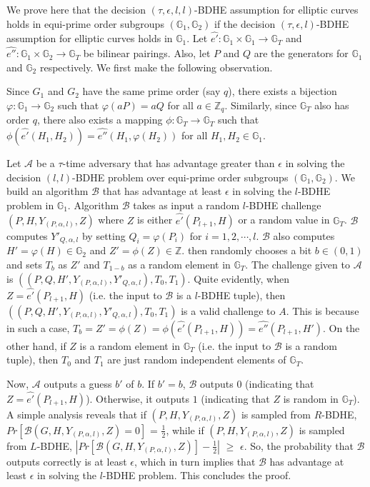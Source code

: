 We prove here that the decision $(\tau,\epsilon,l,l)$-BDHE assumption for elliptic curves holds in equi-prime order subgroups $(\mathbb{G}_1,\mathbb{G}_2)$ if the decision $(\tau,\epsilon,l)$-BDHE assumption for elliptic curves holds in $\mathbb{G}_1$. Let $\hat{e'}:\mathbb{G}_1\times \mathbb{G}_1\longrightarrow\mathbb{G}_T$ and $\hat{e''}:\mathbb{G}_1\times \mathbb{G}_2\longrightarrow\mathbb{G}_T$ be bilinear pairings. Also, let $P$ and $Q$ are the generators for $\mathbb{G}_1$ and $\mathbb{G}_2$ respectively. We first make the following observation. 

 Since $G_1$ and $G_2$ have the same prime order (say $q$), there exists a bijection $\varphi:\mathbb{G}_1\longrightarrow\mathbb{G}_2$ such that $\varphi(aP)=aQ$ for all $a\in\mathbb{Z}_q$. Similarly, since $\mathbb{G}_T$ also has order $q$, there also exists a mapping $\phi:\mathbb{G}_T\longrightarrow\mathbb{G}_T$ such that $\phi(\hat{e'}(H_1,H_2))=\hat{e''}(H_1,\varphi(H_2))$ for all $H_1,H_2 \in \mathbb{G}_1$.

Let $\mathcal{A}$ be a $\tau$-time adversary that has advantage greater than $\epsilon$ in solving the decision $(l,l)$-BDHE problem over equi-prime order subgroups $(\mathbb{G}_1,\mathbb{G}_2)$. We build an algorithm $\mathcal{B}$ that has advantage at least $\epsilon$ in solving the $l$-BDHE problem in $\mathbb{G}_1$. Algorithm $\mathcal{B}$ takes as input a random $l$-BDHE challenge $(P,H,Y_{(P,\alpha,l)},Z)$ where $Z$ is either $\hat{e'}(P_{l+1},H)$ or a random value in $\mathbb{G}_T$. $\mathcal{B}$ computes $Y'_{Q,\alpha,l}$ by setting $Q_i=\varphi(P_i)$ for $i=1,2,\cdots,l$. $\mathcal{B}$ also computes $H'=\varphi(H)\in\mathbb{G}_2$ and $Z'=\phi(Z)\in\mathbb{Z}$. then randomly chooses a bit $b\in{(0,1)}$ and sets $T_b$ as $Z'$ and $T_{1-b}$ as a random element in $\mathbb{G}_T$. The challenge given to $\mathcal{A}$ is 
$((P,Q,H',Y_{(P,\alpha,l)},Y'_{Q,\alpha,l}),T_0,T_1)$. Quite evidently, when $Z=\hat{e'}(P_{l+1},H)$ (i.e. the input to $\mathcal{B}$ is a $l$-BDHE tuple), then $((P,Q,H',Y_{(P,\alpha,l)},Y'_{Q,\alpha,l}),T_0,T_1)$ is a valid challenge to $A$. This is because in such a case, $T_b=Z'=\phi(Z)=\phi(\hat{e'}(P_{l+1},H))=\hat{e''}(P_{l+1},H')$. On the other hand, if $Z$ is a random element in $\mathbb{G}_T$ (i.e. the input to $\mathcal{B}$ is a random tuple), then $T_0$ and $T_1$ are just random independent elements of $\mathbb{G}_T$.

Now, $\mathcal{A}$ outputs a guess $b'$ of $b$. If $b' = b$, $\mathcal{B}$ outputs $0$ (indicating that $Z = \hat{e'}(P_{l+1},H)$). Otherwise, it outputs $1$ (indicating that $Z$ is random in $\mathbb{G}_T$). A simple analysis reveals that if $(P,H,Y_{(P,\alpha,l)},Z)$ is sampled from $R$-BDHE, $Pr[\mathcal{B}(G,H,Y_{(P,\alpha,l)},Z)=0]$ = $\frac{1}{2}$, while if $(P,H,Y_{(P,\alpha,l)},Z)$ is sampled from $L$-BDHE, $|Pr[\mathcal{B}(G,H,Y_{(P,\alpha,l)},Z)]-\frac{1}{2}|$ $\geq$ $\epsilon$. So, the probability that $\mathcal{B}$ outputs correctly is at least $\epsilon$, which in turn implies that $\mathcal{B}$ has advantage at least $\epsilon$ in solving the $l$-BDHE problem. This concludes the proof.



